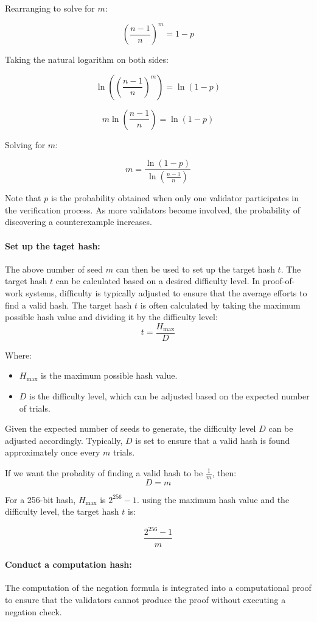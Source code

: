 \documentclass[runningheads]{llncs}
\begin{document}
Rearranging to solve for \( m \):

\[
\left(\frac{n-1}{n}\right)^m = 1 - p
\]

Taking the natural logarithm on both sides:

\[
\ln\left(\left(\frac{n-1}{n}\right)^m\right) = \ln(1 - p)
\]

\[
m \ln\left(\frac{n-1}{n}\right) = \ln(1 - p)
\]

Solving for \( m \):

\[
m = \frac{\ln(1 - p)}{\ln\left(\frac{n-1}{n}\right)}
\]

Note that $p$ is the probability obtained when only one validator participates in the verification process. As more validators become involved, the probability of discovering a counterexample increases.
\paragraph{Set up the taget hash:}
The above number of seed $m$ can then be used to set up the target hash $t$. The target hash $t$ can be calculated based on a desired difficulty level. In proof-of-work systems, difficulty is typically adjusted to ensure that the average efforts to find a valid hash. The target hash $t$ is often calculated by taking the maximum possible hash value and dividing it by the difficulty level:
\[
t = \frac{H_{\text{max}}}{D}
\]

Where:
\begin{itemize}
  \item \( H_{\text{max}} \) is the maximum possible hash value.
  \item \( D \) is the difficulty level, which can be adjusted based on the expected number of trials.
\end{itemize}


Given the expected number of seeds to generate, 
the difficulty level $D$ can be adjusted accordingly. Typically, $D$ is set to ensure that a valid hash is found approximately once every $m$ trials.

If we want the probality of finding a valid hash to be $\frac{1}{m}$, then:
\[
D=m
\]

For a 256-bit hash, $H_{\text{max}}$ is $2^{256} - 1 $.  using the maximum hash value and the difficulty level, the target hash $t$ is:
    
\[
\frac{2^{256} - 1}{m}
\]
\paragraph{Conduct a computation hash:} The computation of the negation formula is integrated into a computational proof to ensure that the validators cannot produce the proof without executing a negation check.
\end{document}

